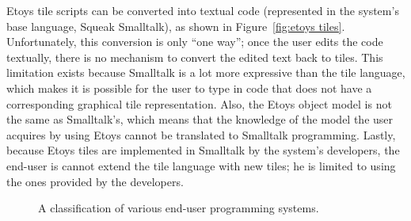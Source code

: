 Etoys tile scripts can be converted into textual code (represented in the system's base language,
Squeak Smalltalk), as shown in Figure~\ref{fig:etoys tiles}.
Unfortunately, this conversion
is only ``one way''; once the user edits the code
textually, there is no mechanism to convert the edited text back to
tiles.
This limitation exists because Smalltalk is a lot more expressive than the tile language, which
makes it is possible for the user to type in code that does not have a
corresponding graphical tile representation.
Also, the Etoys object model is not the same as Smalltalk's, which means that 
the knowledge of the model the user acquires by using Etoys cannot be
translated to Smalltalk programming.
Lastly, because Etoys tiles are implemented in Smalltalk by the system's developers, the end-user is
cannot extend the tile language with new tiles; he is limited to using the ones provided by the
developers.

\begin{figure}[tp]
\centering
{}
\caption{A classification of various end-user programming systems.}
\label{fig:spectrum}
\end{figure}


